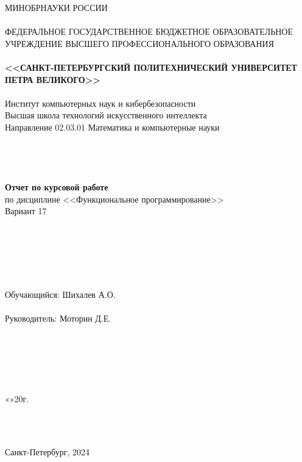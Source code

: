 \documentclass[a4paper, final]{article}
\begin{document}
\thispagestyle{empty}

\begin{center}
	{\Large МИНОБРНАУКИ РОССИИ}\\
	~\\
	{\large ФЕДЕРАЛЬНОЕ ГОСУДАРСТВЕННОЕ БЮДЖЕТНОЕ ОБРАЗОВАТЕЛЬНОЕ УЧРЕЖДЕНИЕ ВЫСШЕГО ПРОФЕССИОНАЛЬНОГО ОБРАЗОВАНИЯ}\\
	~\\
	{\Large \bf <<САНКТ-ПЕТЕРБУРГСКИЙ ПОЛИТЕХНИЧЕСКИЙ УНИВЕРСИТЕТ ПЕТРА ВЕЛИКОГО>>}\\
	~\\
	{\large Институт компьютерных наук и кибербезопасности }\\
	{\large Высшая школа технологий искусственного интеллекта}\\
	{\large Направление 02.03.01 Математика и компьютерные науки}\\
	~\\
	~\\
	~\\
	~\\
	{\Large \bf  Отчет по курсовой работе }\\
	\vspace{3mm}
	{\Large {по дисциплине <<Функциональное программирование>>}}\\
	\vspace{3mm}
	{\Large {Вариант 17}}\\
	~\\
	~\\
	~\\
	~\\
	~\\
	~\\
	{\large Обучающийся: \underline{\hspace{3.5cm}} \hspace{12mm} Шихалев А.О.}\\
	~\\
	{\large Руководитель: \underline{\hspace{3.5cm}} \hspace{12mm} Моторин Д.Е.}\\
	~\\
	~\\
	~\\
	~\\
	~\\
\end{center}
\begin{flushright}
	
	«\underline{\hspace{1cm}}»\underline{\hspace{3cm}}20\underline{\hspace{0.7cm}}г.
\end{flushright}
~\\
~\\
\begin{center}
	{\large Санкт-Петербург, 2024}
\end{center}
\end{document}
